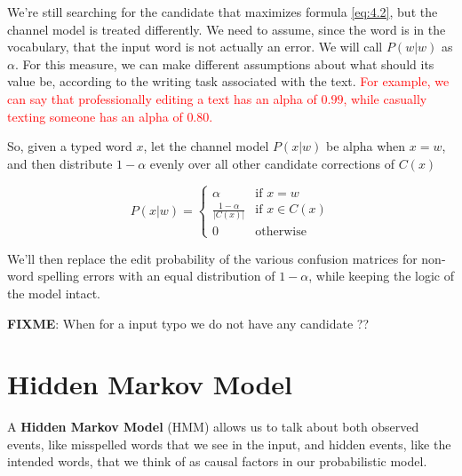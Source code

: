 We're still searching for the candidate that maximizes formula \ref{eq:4.2}, but the channel model is treated 
differently. 
We need to assume, since the word is in the vocabulary, that the input word is not actually an error. We will call 
$P(w|w)$ as $\alpha$. For this measure, we can make different assumptions about what should its value be, 
according to the writing task associated with the text. \textcolor{red}{For example, we can say that 
professionally editing a text has an alpha of $0.99$, while casually texting someone has an alpha of $0.80$.}

So, given a typed word $x$, let the channel model $P(x|w)$ be alpha when $x = w$, and then distribute 
$1-\alpha $ evenly over all other candidate corrections of $C(x)$ 

\begin{equation}\label{eq:4.3}
	P(x|w) = \begin{cases} 
	\alpha & \mbox{if } x = w \\ 
	\frac{1-\alpha}{|C(x)|} & \mbox{if }  x \in C(x) \\
	0 & \mbox{otherwise} 
	\end{cases}
\end{equation}

We'll then replace the edit probability of the various confusion matrices for non-word spelling errors with an 
equal distribution of $1-\alpha$, while keeping the logic of the model intact.

\textbf{FIXME}: When for a input typo we do not have any candidate ?? 


\section{Hidden Markov Model}
\label{section:hmm}
A \textbf{Hidden Markov Model} (HMM) allows us to talk about both observed events, like misspelled words that 
we see in the input, and hidden events, like the intended words, that we think of as causal factors in our 
probabilistic model. 

